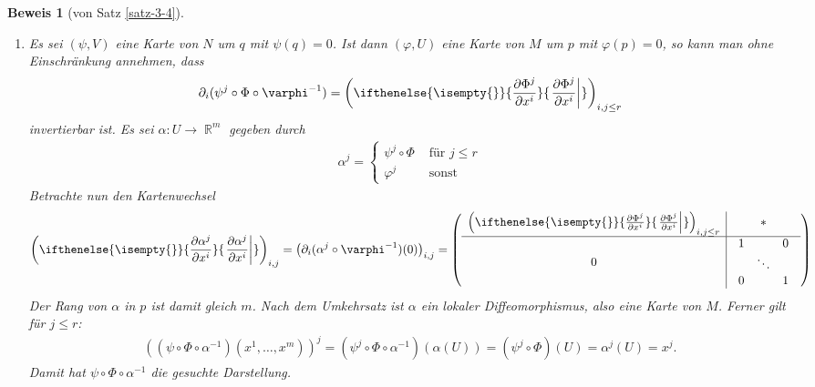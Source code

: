 \documentclass[paper=A4, twoside, chapterprefix=true, bibliography=totoc, headsepline]{scrbook}
\let\temp\phi{}
\let\phi\varphi{}
\let\varphi\temp{}
\let\temp\theta{}
\let\theta\vartheta{}
\let\vartheta\temp{}
\let\temp\epsilon{}
\let\epsilon\varepsilon{}
\let\varepsilon\temp{}
\let\temp\rho{}
\let\rho\varrho{}
\let\varrho\temp{}
\DeclareMathOperator{\R}{\mathbb{R}}
\newcommand{\pdifffrac}[3][]{\ifthenelse{\isempty{#1}}{\frac{\partial #2}{\partial #3}}{\left. \frac{\partial #2}{\partial #3} \right|_{#1}}}
\theoremstyle{plain}
\theoremstyle{nonumberplain}
\newtheorem{bew}{Beweis}
\theoremstyle{empty}
\theoremstyle{break}
\begin{document}

\begin{bew}[von Satz \ref{satz-3-4}] %
\begin{enumerate}[label=(\roman*),widest=ii,leftmargin=*]
  \item
  Es sei $(\psi, V)$ eine Karte von $N$ um $q$ mit $\psi(q) = 0$.
  Ist dann $(\phi, U)$ eine Karte von $M$ um $p$ mit $\phi(p) = 0$, so kann man ohne Einschr\"ankung annehmen, dass 
  \begin{align*}
    \partial_i(\psi^j \circ \Phi \circ \phi^{-1}) = \left(\pdifffrac{\Phi^j}{x^i}\right)_{i,j \leq r} 
  \end{align*}
  invertierbar ist.
  Es sei $\alpha \colon U \to \R^m$ gegeben durch
  \begin{align*}
    \alpha^j =
    \begin{cases}
      \psi^j \circ \Phi & \text{ f\"ur } j \leq r\\
      \phi^j & \text{ sonst}
    \end{cases}
  \end{align*}
  Betrachte nun den Kartenwechsel
  \begin{align*}
    \left(\pdifffrac{\alpha^j}{x^i}\right)_{i,j} = \left(\partial_i(\alpha^j \circ \phi^{-1})(0)\right)_{i,j} = \left(
      \begin{array}{c|c}
        \left(\pdifffrac{\Phi^j}{x^i}\right)_{i,j \le r} & \ast\\
        \hline
        0 & 
        \begin{array}{ccc}
          1 &&0\\
          &\ddots&\\
          0&&1
        \end{array}
      \end{array}\right)
  \end{align*}
  Der Rang von $\alpha$ in $p$ ist damit gleich $m$. Nach dem Umkehrsatz ist $\alpha$ ein lokaler Diffeomorphismus, also eine Karte von $M$. Ferner gilt f\"ur $j \leq r$:
  \begin{align*}
    \left((\psi \circ \Phi \circ \alpha^{-1})(x^1,\ldots,x^m)\right)^j = (\psi^j \circ \Phi \circ \alpha^{-1})(\alpha(U)) = (\psi^j\circ \Phi)(U) = \alpha^j(U) = x^j.
  \end{align*}
  Damit hat $\psi \circ \Phi \circ \alpha^{-1}$ die gesuchte Darstellung.


\end{enumerate}
\end{bew}
\end{document}
